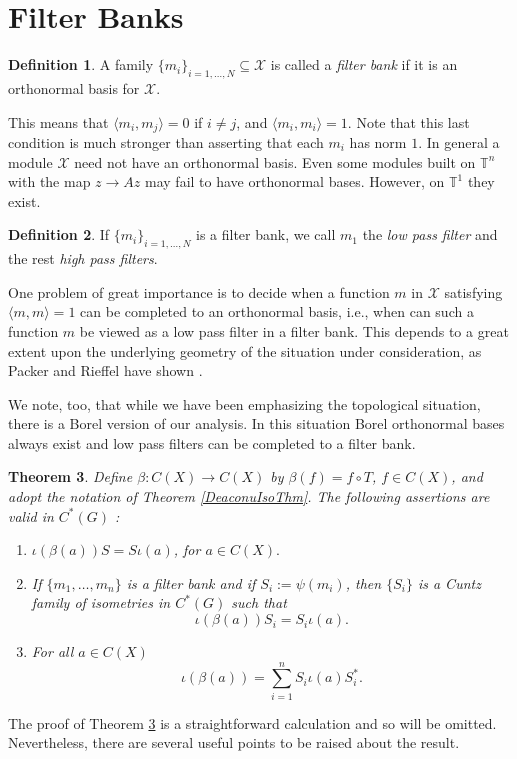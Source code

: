 \documentclass{amsproc}
\theoremstyle{plain}
\newtheorem{thm}{Theorem}[section]
\theoremstyle{definition}
\theoremstyle{definition}
\newtheorem{defn}[thm]{Definition}
\theoremstyle{remark}
\theoremstyle{plain}
\begin{document}
\section{Filter Banks}

\begin{defn}
A family $\{ m_{i}\}_{i=1,\dots,N}\subseteq\mathcal{X}$ is called
a \emph{filter bank} if it is an orthonormal basis for $\mathcal{X}$. 
\end{defn}
This means that $\langle m_{i},m_{j}\rangle=0$ if $i\neq j$, and
$\langle m_{i},m_{i}\rangle=1$. Note that this last condition is
much stronger than asserting that each $m_{i}$ has norm $1$. In
general a module $\mathcal{X}$ need not have an orthonormal basis.
Even some modules built on $\mathbb{T}^{n}$ with the map $z\to Az$
may fail to have orthonormal bases. However, on $\mathbb{T}^{1}$
they exist.

\begin{defn}
If $\{ m_{i}\}_{i=1,\dots,N}$ is a filter bank, we call $m_{1}$
the \emph{low pass filter} and the rest \emph{high pass filters}. 
\end{defn}
One problem of great importance is to decide when a function $m$
in $\mathcal{X}$ satisfying $\langle m,m\rangle=1$ can be completed
to an orthonormal basis, i.e., when can such a function $m$ be viewed
as a low pass filter in a filter bank. This depends to a great extent
upon the underlying geometry of the situation under consideration,
as Packer and Rieffel have shown \cite{PR03,PR04}.

We note, too, that while we have been emphasizing the topological
situation, there is a Borel version of our analysis. In this situation
Borel orthonormal bases always exist and low pass filters can be completed
to a filter bank.

\begin{thm}
\label{StaceyXpd2}Define $\beta:C(X)\to C(X)$ by $\beta(f)=f\circ T$,
$f\in C(X)$, and adopt the notation of Theorem \ref{DeaconuIsoThm}.
The following assertions are valid in $C^{*}(G)$ : 
\begin{enumerate}
\item $\iota(\beta(a))S=S\iota(a)$, for $a\in C(X).$ 
\item If $\{ m_{1},\dots,m_{n}\}$ is a filter bank and if $S_{i}:=\psi(m_{i})$,
then $\{ S_{i}\}$ is a Cuntz family of isometries in $C^{*}(G)$
such that\[
\iota(\beta(a))S_{i}=S_{i}\iota(a).\]

\item For all $a\in C(X)$\begin{equation}
\iota(\beta(a))=\sum_{i=1}^{n}S_{i}\iota(a)S_{i}^{*}.\label{eq:inner}
\end{equation}

\end{enumerate}
\end{thm}
The proof of Theorem \ref{StaceyXpd2} is a straightforward calculation
and so will be omitted. Nevertheless, there are several useful points
to be raised about the result.
\end{document}
